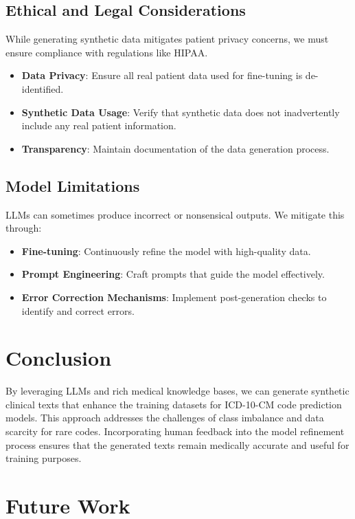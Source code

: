 \documentclass[12pt, a4paper]{article}
\begin{document}
\subsection{Ethical and Legal Considerations}

While generating synthetic data mitigates patient privacy concerns, we must ensure compliance with regulations like HIPAA.

\begin{itemize}
    \item \textbf{Data Privacy}: Ensure all real patient data used for fine-tuning is de-identified.
    \item \textbf{Synthetic Data Usage}: Verify that synthetic data does not inadvertently include any real patient information.
    \item \textbf{Transparency}: Maintain documentation of the data generation process.
\end{itemize}

\subsection{Model Limitations}

LLMs can sometimes produce incorrect or nonsensical outputs. We mitigate this through:

\begin{itemize}
    \item \textbf{Fine-tuning}: Continuously refine the model with high-quality data.
    \item \textbf{Prompt Engineering}: Craft prompts that guide the model effectively.
    \item \textbf{Error Correction Mechanisms}: Implement post-generation checks to identify and correct errors.
\end{itemize}

\section{Conclusion}

By leveraging LLMs and rich medical knowledge bases, we can generate synthetic clinical texts that enhance the training datasets for ICD-10-CM code prediction models. This approach addresses the challenges of class imbalance and data scarcity for rare codes. Incorporating human feedback into the model refinement process ensures that the generated texts remain medically accurate and useful for training purposes.

\section{Future Work}
\end{document}
